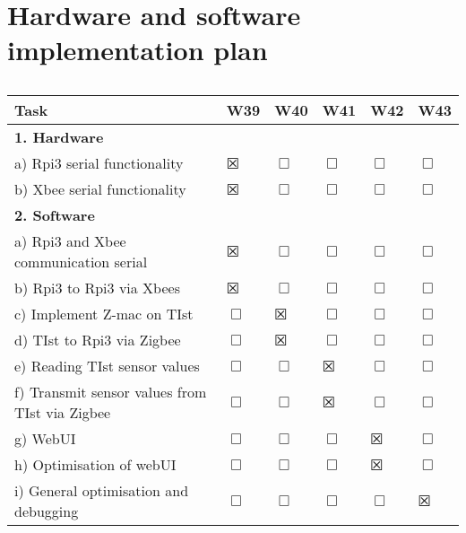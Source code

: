 \section{Hardware and software implementation plan}

\begin{table}[htbp]
	\caption{}
	\begin{tabular}{p{4.1cm}|lllll}
		\toprule
		Task & W39 & W40 & W41 & W42 & W43 \\ 
		\midrule
		\multicolumn{6}{l}{\textbf{1. Hardware}} \\ 
		\midrule
		a) Rpi3 serial functionality & $\XBox$ & $\Box$ & $\Box$ & $\Box$ & $\Box$\\ 
		\midrule
		b) Xbee serial functionality  & $\XBox$ & $\Box$ & $\Box$ & $\Box$ & $\Box$ \\ 
		\midrule
		\multicolumn{6}{l}{\textbf{2. Software}}\\ 
		\midrule
		a) Rpi3 and Xbee communication serial & $\XBox$ & $\Box$ & $\Box$ & $\Box$ & $\Box$ \\ 
		\midrule
		b) Rpi3 to Rpi3 via Xbees  & $\XBox$ & $\Box$ & $\Box$ & $\Box$ & $\Box$\\ 
		\midrule
		c) Implement Z-mac on TIst  & $\Box$ & $\XBox$ & $\Box$ & $\Box$ & $\Box$ \\ 
		\midrule
		d) TIst to Rpi3 via Zigbee  & $\Box$ & $\XBox$ & $\Box$ & $\Box$ & $\Box$  \\ 
		\midrule
		e) Reading TIst sensor values  & $\Box$ & $\Box$ & $\XBox$ & $\Box$ & $\Box$ \\ 
		\midrule
		f) Transmit sensor values from TIst via Zigbee   & $\Box$ & $\Box$ & $\XBox$ & $\Box$ & $\Box$  \\ 
		\midrule
		g) WebUI & $\Box$ & $\Box$ & $\Box$ & $\XBox$ & $\Box$ \\ 
		\midrule
		h) Optimisation of webUI & $\Box$ & $\Box$ & $\Box$ & $\XBox$ & $\Box$ \\ 
		\midrule
		i) General optimisation and debugging  & $\Box$ & $\Box$ & $\Box$ & $\Box$ & $\XBox$  \\ 
		
		\bottomrule
	\end{tabular}
	\label{}
\end{table}


